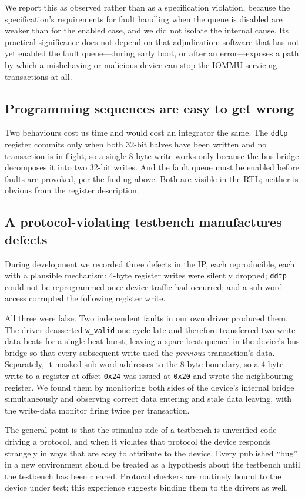 \documentclass[journal]{IEEEtran}
\begin{document}
We report this as observed rather than as a specification violation, because the
specification's requirements for fault handling when the queue is disabled are
weaker than for the enabled case, and we did not isolate the internal cause. Its
practical significance does not depend on that adjudication: software that has
not yet enabled the fault queue---during early boot, or after an error---exposes
a path by which a misbehaving or malicious device can stop the IOMMU servicing
transactions at all.

\subsection{Programming sequences are easy to get wrong}
Two behaviours cost us time and would cost an integrator the same. The
\texttt{ddtp} register commits only when both 32-bit halves have been written
and no transaction is in flight, so a single 8-byte write works only because the
bus bridge decomposes it into two 32-bit writes. And the fault queue must be
enabled before faults are provoked, per the finding above. Both are visible in
the RTL; neither is obvious from the register description.

\subsection{A protocol-violating testbench manufactures defects}
\label{sec:false}
During development we recorded three defects in the IP, each reproducible, each
with a plausible mechanism: 4-byte register writes were silently dropped;
\texttt{ddtp} could not be reprogrammed once device traffic had occurred; and a
sub-word access corrupted the following register write.

All three were false. Two independent faults in our own driver produced them.
The driver deasserted \texttt{w\_valid} one cycle late and therefore transferred
two write-data beats for a single-beat burst, leaving a spare beat queued in the
device's bus bridge so that every subsequent write used the \emph{previous}
transaction's data. Separately, it masked sub-word addresses to the 8-byte
boundary, so a 4-byte write to a register at offset \texttt{0x24} was issued at
\texttt{0x20} and wrote the neighbouring register. We found them by monitoring
both sides of the device's internal bridge simultaneously and observing correct
data entering and stale data leaving, with the write-data monitor firing twice
per transaction.

The general point is that the stimulus side of a testbench is unverified code
driving a protocol, and when it violates that protocol the device responds
strangely in ways that are easy to attribute to the device. Every published
``bug'' in a new environment should be treated as a hypothesis about the
testbench until the testbench has been cleared. Protocol checkers are routinely
bound to the device under test; this experience suggests binding them to the
drivers as well.
\end{document}
